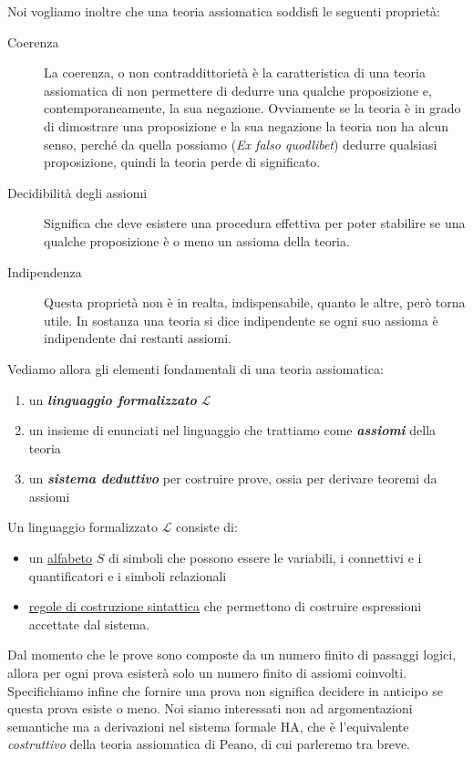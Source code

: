 Noi vogliamo inoltre che una teoria assiomatica soddisfi le seguenti propriet\`a:
\begin{description}
\item[Coerenza]
La coerenza, o non contraddittoriet\`a \`e la caratteristica di una teoria assiomatica di non permettere di dedurre una qualche proposizione e, contemporaneamente, la sua negazione. 
Ovviamente se la teoria \`e in grado di dimostrare una proposizione e la sua negazione la teoria non ha alcun senso, perché da quella possiamo (\textit{Ex falso quodlibet}) dedurre qualsiasi proposizione, quindi la teoria perde di significato.
\item[Decidibilit\`a degli assiomi] Significa che deve esistere una procedura effettiva per poter stabilire se una qualche proposizione \`e o meno un assioma della teoria.
\item[Indipendenza] Questa propriet\`a non \`e in realta, indispensabile, quanto le altre, per\`o torna utile.
In sostanza una teoria si dice indipendente se ogni suo assioma \`e indipendente dai restanti assiomi. 
\end{description}

\vspace{0.4 cm}
Vediamo allora gli elementi fondamentali di una teoria assiomatica:
\begin{enumerate}
	\item un \textsl{\textbf{linguaggio formalizzato}} $\mathcal{L}$
\item un insieme di enunciati nel linguaggio che trattiamo come \textsl{\textbf{assiomi}} della teoria
\item un \textsl{\textbf{sistema deduttivo}} per costruire prove, ossia per derivare teoremi da assiomi

\end{enumerate}
Un linguaggio formalizzato $\mathcal{L}$ consiste di:
\begin{itemize}
\item un \underline{alfabeto} $S$ di simboli che possono essere le variabili, i connettivi e i quantificatori e i simboli relazionali
\item \underline{regole di costruzione sintattica} che permettono di costruire espressioni accettate dal sistema.
\end{itemize}
\vspace{0.5 cm}

Dal momento che le prove sono composte da un numero finito di passaggi logici, allora per ogni prova esister\`a solo un numero finito di assiomi coinvolti. \\
Specifichiamo infine che fornire una prova non significa decidere in anticipo se questa prova esiste o meno. Noi siamo interessati non ad argomentazioni semantiche ma a derivazioni nel sistema formale HA, che \`e l'equivalente \textsl{costruttivo} della teoria assiomatica di Peano, di cui parleremo tra breve.

